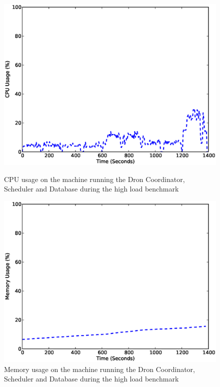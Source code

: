 \documentclass[11pt,a4paper,twoside]{report}
\begin{document}
\begin{figure}[ht]
\begin{minipage}[b]{0.5\linewidth}
\centering
\includegraphics[scale=0.35]{dron-large-cpu}
\caption{CPU usage on the machine running the Dron Coordinator, Scheduler and Database during the high load benchmark}
\label{fig:DronLargeCpu}
\end{minipage}
\hspace{0.1cm}
\begin{minipage}[b]{0.48\linewidth}
\centering
\includegraphics[scale=0.35]{dron-large-mem}
\caption{Memory usage on the machine running the Dron Coordinator, Scheduler and Database during the high load benchmark}
\label{fig:DronLargeMem}
\end{minipage}
\end{figure}
\end{document}
